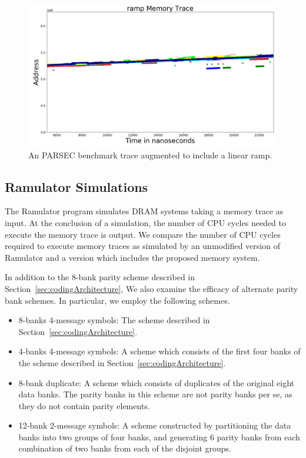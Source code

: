 \begin{figure}[h!]
		\includegraphics[width=\linewidth]{figures/vips_ramp.png}
		\caption{An PARSEC benchmark trace augmented to include a linear ramp.}
		\label{fig:vips_ramp}
\end{figure}

\subsection{Ramulator Simulations}
The Ramulator program simulates DRAM systems taking a memory trace as input. At the conclusion of a simulation, the number of CPU cycles needed to execute the memory trace is output. We compare the number of CPU cycles required to execute memory traces as simulated by an unmodified version of Ramulator and a version which includes the proposed memory system.

In addition to the 8-bank parity scheme described in Section~\ref{sec:codingArchitecture}, We also examine the efficacy of alternate parity bank schemes. In particular, we employ the following schemes.
\begin{itemize}
	\item 8-banks 4-message symbols: The scheme described in Section~\ref{sec:codingArchitecture}.
	\item 4-banks 4-message symbols: A scheme which consists of the first four banks of the scheme described in Section~\ref{sec:codingArchitecture}.
	\item 8-bank duplicate: A scheme which consists of duplicates of the original eight data banks. The parity banks in this scheme are not parity banks per se, as they do not contain parity elements.
	\item 12-bank 2-message symbols: A scheme constructed by partitioning the data banks into two groups of four banks, and generating 6 parity banks from each combination of two banks from each of the disjoint groups.
\end{itemize}

